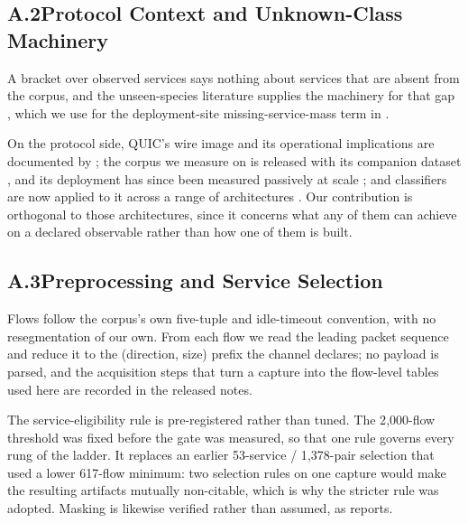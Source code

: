 \documentclass[letterpaper,twocolumn,10pt]{article}
\begin{document}
\subsection*{A.2\quad Protocol Context and Unknown-Class Machinery}

A bracket over observed services says nothing about services that are absent
from the corpus, and the unseen-species literature supplies the machinery for
that gap \citep{orlitsky2016optimal,eriksson2026unseen}, which we use for the
deployment-site missing-service-mass term in .

On the protocol side, QUIC's wire image and its operational implications are
documented by \citet{kuhlewind2022rfc}; the corpus we measure on is released with
its companion dataset \citep{cesnet2025cesnet,luxemburk2023cesnet}, and its
deployment has since been measured passively at scale \citep{mucke2025waiting};
and classifiers are now applied to it across a range of architectures
\citep{luxemburk2023encryptedquic,zhang2023applicationquic,lin2022etbert,zhao2023yatc,meng2023netgpt,cui2025trafficllm,hu2022opencbd,smith2021website,li2023facing,jerabek2025simple}.
Our contribution is orthogonal to those architectures, since it concerns what any
of them can achieve on a declared observable rather than how one of them is
built.

\subsection*{A.3\quad Preprocessing and Service Selection}
\label{sec:appendix/preprocessing}

Flows follow the corpus's own five-tuple and idle-timeout convention, with no
resegmentation of our own. From each flow we read the leading packet sequence and
reduce it to the (direction, size) prefix the channel declares; no payload is
parsed, and the acquisition steps that turn a capture into the flow-level tables
used here are recorded in the released notes.

The service-eligibility rule is pre-registered rather than tuned. The
2{,}000-flow threshold was fixed before the gate was measured, so that one rule
governs every rung of the ladder. It replaces an earlier 53-service /
1{,}378-pair selection that used a lower 617-flow minimum: two selection rules
on one capture would make the resulting artifacts mutually non-citable, which is
why the stricter rule was adopted. Masking is likewise verified rather than
assumed, as  reports.
\end{document}
